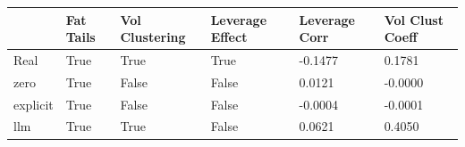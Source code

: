 \begin{tabular}{llllll}
\toprule
 & Fat Tails & Vol Clustering & Leverage Effect & Leverage Corr & Vol Clust Coeff \\
\midrule
Real & True & True & True & -0.1477 & 0.1781 \\
zero & True & False & False & 0.0121 & -0.0000 \\
explicit & True & False & False & -0.0004 & -0.0001 \\
llm & True & True & False & 0.0621 & 0.4050 \\
\bottomrule
\end{tabular}
